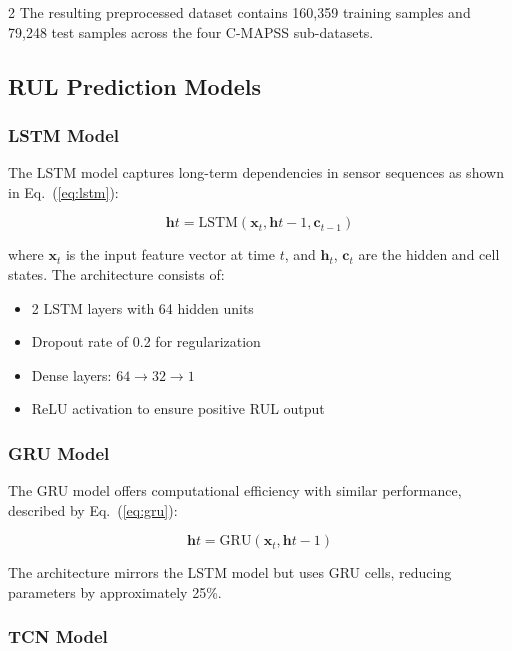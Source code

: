 \documentclass{ijceds} %
\newcommand{\equref}[1]{Eq.~(\ref{#1})} %
\begin{document}
\begin{multicols}{2}
The resulting preprocessed dataset contains 160,359 training samples and 79,248 test samples across the four C-MAPSS sub-datasets.




\subsection{RUL Prediction Models}

\subsubsection{LSTM Model}

The LSTM model captures long-term dependencies in sensor sequences as shown in \equref{eq:lstm}:

\begin{equation}
    \mathbf{h}t = \text{LSTM}(\mathbf{x}_t, \mathbf{h}{t-1}, \mathbf{c}_{t-1})
    \label{eq:lstm}
\end{equation}

where $\mathbf{x}_t$ is the input feature vector at time $t$, and $\mathbf{h}_t$, $\mathbf{c}_t$ are the hidden and cell states. The architecture consists of:

\begin{itemize}
    \item 2 LSTM layers with 64 hidden units
    \item Dropout rate of 0.2 for regularization
    \item Dense layers: $64 \rightarrow 32 \rightarrow 1$
    \item ReLU activation to ensure positive RUL output
\end{itemize}

\subsubsection{GRU Model}

The GRU model offers computational efficiency with similar performance, described by \equref{eq:gru}:

\begin{equation}
    \mathbf{h}t = \text{GRU}(\mathbf{x}_t, \mathbf{h}{t-1})
    \label{eq:gru}
\end{equation}

The architecture mirrors the LSTM model but uses GRU cells, reducing parameters by approximately 25\%.

\subsubsection{TCN Model}


\end{multicols}
\end{document}

